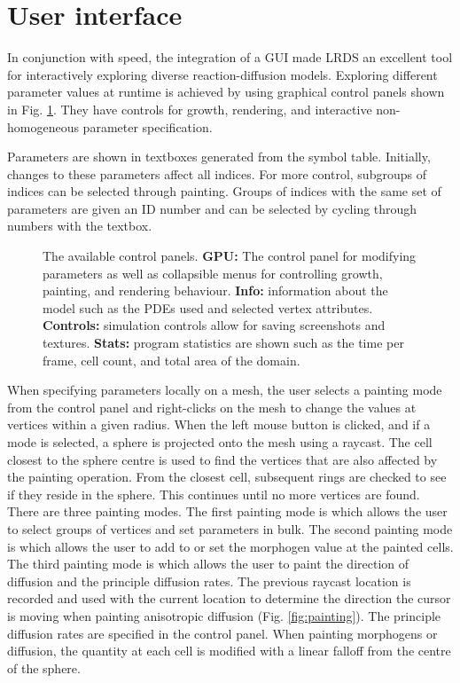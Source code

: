 \section{User interface}
In conjunction with speed, the integration of a GUI made LRDS an excellent tool for interactively exploring diverse reaction-diffusion models. Exploring different parameter values at runtime is achieved by using graphical control panels shown in Fig. \ref{fig:GUIexample}. They have controls for growth, rendering, and interactive non-homogeneous parameter specification. 

Parameters are shown in textboxes generated from the symbol table. Initially, changes to these parameters affect all indices. For more control, subgroups of indices can be selected through painting. Groups of indices with the same set of parameters are given an ID number and can be selected by cycling through numbers with the  textbox. 

\begin{figure}[ht]
	\centering
	\caption[The available control panels]{The available control panels. \textbf{GPU:} The control panel for modifying parameters as well as collapsible menus for controlling growth, painting, and rendering behaviour. \textbf{Info:} information about the model such as the PDEs used and selected vertex attributes. \textbf{Controls:} simulation controls allow for saving screenshots and textures. \textbf{Stats:} program statistics are shown such as the time per frame, cell count, and total area of the domain.} 
	\label{fig:GUIexample}
\end{figure}

When specifying parameters locally on a mesh, the user selects a painting mode from the control panel and right-clicks on the mesh to change the values at vertices within a given radius. When the left mouse button is clicked, and if a mode is selected, a sphere is projected onto the mesh using a raycast. The cell closest to the sphere centre is used to find the vertices that are also affected by the painting operation. From the closest cell, subsequent rings are checked to see if they reside in the sphere. This continues until no more vertices are found. There are three painting modes. The first painting mode is  which allows the user to select groups of vertices and set parameters in bulk. The second painting mode is  which allows the user to add to or set the morphogen value at the painted cells. The third painting mode is  which allows the user to paint the direction of diffusion and the principle diffusion rates. The previous raycast location is recorded and used with the current location to determine the direction the cursor is moving when painting anisotropic diffusion (Fig. \ref{fig:painting}). The principle diffusion rates are specified in the control panel. When painting morphogens or diffusion, the quantity at each cell is modified with a linear falloff from the centre of the sphere.

